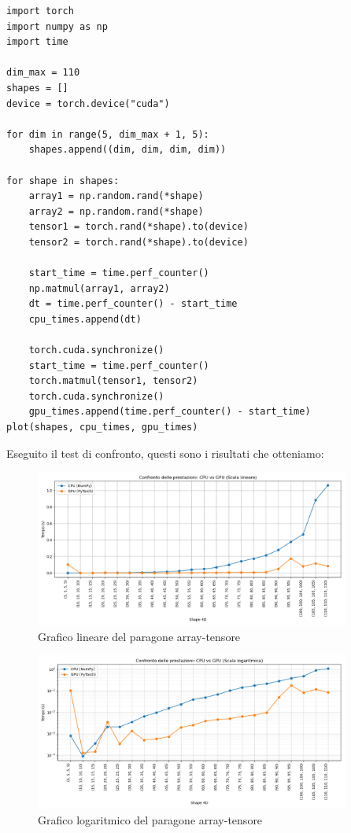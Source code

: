 \begin{lstlisting}
import torch
import numpy as np
import time

dim_max = 110
shapes = []
device = torch.device("cuda")

for dim in range(5, dim_max + 1, 5):
    shapes.append((dim, dim, dim, dim))

for shape in shapes:
    array1 = np.random.rand(*shape)
    array2 = np.random.rand(*shape)
    tensor1 = torch.rand(*shape).to(device)
    tensor2 = torch.rand(*shape).to(device)

    start_time = time.perf_counter()
    np.matmul(array1, array2)
    dt = time.perf_counter() - start_time
    cpu_times.append(dt)

    torch.cuda.synchronize() 
    start_time = time.perf_counter()
    torch.matmul(tensor1, tensor2)
    torch.cuda.synchronize()
    gpu_times.append(time.perf_counter() - start_time)
plot(shapes, cpu_times, gpu_times)

\end{lstlisting}

Eseguito il test di confronto, questi sono i risultati che otteniamo: 

\begin{figure}[H]
    \centering
    \includegraphics[width=0.92\textwidth]{Immagini/Grafici/Tensor_lin_plot.png}
    \caption{Grafico lineare del paragone array-tensore }
\end{figure}

\begin{figure}[H]
    \centering
    \includegraphics[width=0.92\textwidth]{Immagini/Grafici/Tensor_log_plot.png}
    \caption{Grafico logaritmico del paragone array-tensore }
\end{figure}
 

